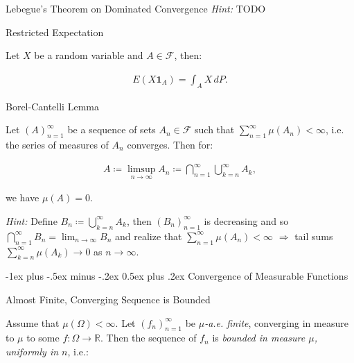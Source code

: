 \documentclass[10pt,landscape]{article}
\makeatletter
\newcommand{\Hint}{\textit{Hint: }}
\newcommand{\Indicator}[1]{\mathbf{1}_{#1}}
\newcommand{\CalF}{\mathcal{F}}
\renewcommand{\section}{\@startsection{section}{1}{0mm}%
                                {-1ex plus -.5ex minus -.2ex}%
                                {0.5ex plus .2ex}%
                                {\normalfont\large\bfseries}}
\makeatother
\begin{document}
\begin{multicols}{3}
\begin{theorem}{3.12}{Lebegue's Theorem on Dominated Convergence}
    \Hint TODO

\end{theorem}

\begin{proposition}{}{Restricted Expectation}

    Let $X$ be a random variable and $A \in \CalF$, then:

        \begin{align*}
            E(X \Indicator{A}) = \int_A X \,dP.
        \end{align*}

\end{proposition}

\begin{lemma}{4.4}{Borel-Cantelli Lemma}

    Let $(A)_{n=1}^{\infty}$ be a sequence of sets $A_n \in \CalF$ such that $\sum_{n=1}^{\infty} \mu(A_n) < \infty$, i.e. the series of measures of $A_n$ converges. Then for:

        \begin{align*}
            A \coloneqq \limsup_{n \to \infty} A_n \coloneqq \bigcap_{n=1}^{\infty} \bigcup_{k=n}^{\infty} A_k,
        \end{align*}

    we have $\mu(A) = 0$.

    \Hint Define $B_n \coloneqq \bigcup_{k=n}^{\infty} A_k$, then $(B_n)_{n=1}^\infty$ is decreasing and so $\bigcap_{n=1}^{\infty} B_n = \lim_{n \to \infty} B_n$ and realize that $\sum_{n=1}^{\infty} \mu(A_n) < \infty$ $\Rightarrow$ tail sums $\sum_{k=n}^{\infty} \mu(A_k) \to 0$ as $n \to \infty$.

\end{lemma}


\section{Convergence of Measurable Functions}

\begin{exercise}{5.2}{Almost Finite, Converging Sequence is Bounded}

    Assume that $\mu(\Omega) < \infty$. Let $(f_n)_{n=1}^{\infty}$ be \emph{$\mu$-a.e. finite}, converging in measure to $\mu$ to some $f: \Omega \to \mathbb{R}$. Then the sequence of $f_n$ is \emph{bounded in measure $\mu$, uniformly in $n$}, i.e.:


\end{exercise}
\end{multicols}
\end{document}
